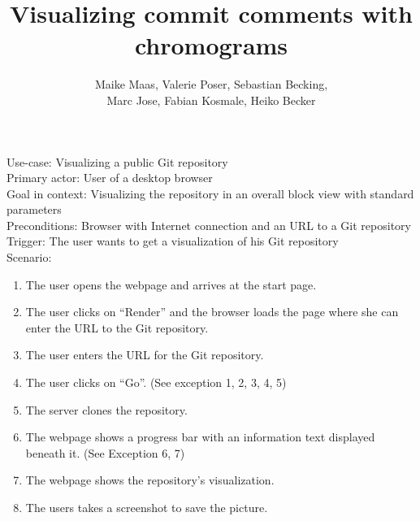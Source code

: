 \documentclass[11pt]{scrartcl}
\author{Maike Maas, Valerie Poser, Sebastian Becking,\\
Marc Jose, Fabian Kosmale, Heiko Becker}
\title{Visualizing commit comments with chromograms}
\begin{document}
\maketitle

Use-case: Visualizing a public Git repository \\
Primary actor: User of a desktop browser \\
Goal in context: Visualizing the repository in an overall block view with standard parameters \\
Preconditions: Browser with Internet connection and an URL to a Git repository\\
Trigger: The user wants to get a visualization of his Git repository \\

Scenario:
\begin{enumerate}
\item The user opens the webpage and arrives at the start page.
\item The user clicks on \enquote{Render} and the browser loads the page where
	she can enter the URL to the Git repository. 
\item The user enters the URL for the Git repository. 
\item The user clicks on \enquote{Go}. (See exception 1, 2, 3, 4, 5)
\item The server clones the repository.
\item The webpage shows a progress bar with an information text displayed beneath
	it. (See Exception 6, 7)
\item The webpage shows the repository's visualization.
\item The users takes a screenshot to save the picture. 
\end{enumerate}
\end{document}
